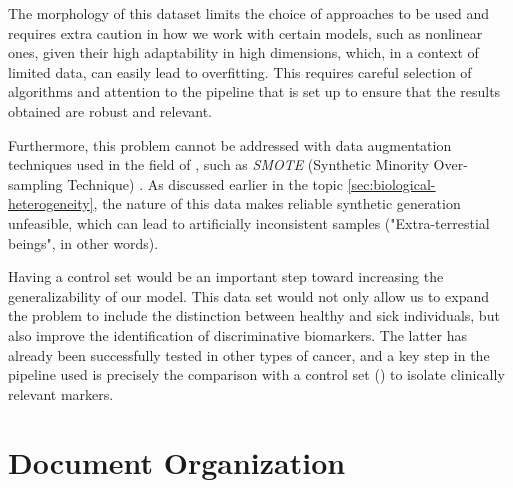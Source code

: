 The morphology of this dataset limits the choice of approaches to be used and
requires extra caution in how we work with certain models, such as nonlinear
ones, given their high adaptability in high dimensions, which, in a context of
limited data, can easily lead to overfitting. This requires careful selection
of algorithms and attention to the pipeline that is set up to ensure that the
results obtained are robust and relevant.

Furthermore, this problem cannot be addressed with data augmentation techniques
used in the field of , such as \textit{SMOTE} (Synthetic
Minority Over-sampling Technique) \textcite{SMOTE_Blagus2013SMOTE}. As
discussed earlier in the topic \ref{sec:biological-heterogeneity}, the nature
of this data makes reliable synthetic generation unfeasible, which can lead to
artificially inconsistent samples ("Extra-terrestial beings", in other words).

Having a control set would be an important step toward increasing the
generalizability of our model. This data set would not only allow us to expand
the problem to include the distinction between healthy and sick individuals,
but also improve the identification of discriminative biomarkers. The latter
has already been successfully tested in other types of cancer, and a key step
in the pipeline used is precisely the comparison with a control set
(\textcite{ml_gastric_Azari2023}) to isolate clinically relevant markers.

\section{Document Organization}
\label{sec:document-organization}